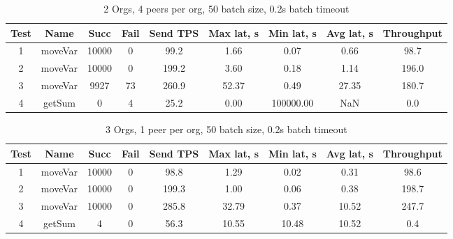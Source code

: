 \begin{appendices}
\begin{table}[h!]
\begin{center}
\begin{tabular}{ |c|c|c|c|c|c|c|c|c| }
 \hline
  Test & Name & Succ  & Fail & Send TPS & Max lat, s & Min lat, s & Avg lat, s & Throughput \\
 \hline
 \hline
 1    & moveVar & 10000 & 0    & 99.2  & 1.66      & 0.07      & 0.66      & 98.7  \\
 \hline
 2    & moveVar & 10000 & 0    & 199.2 & 3.60      & 0.18      & 1.14      & 196.0 \\
 \hline
 3    & moveVar & 9927  & 73   & 260.9 & 52.37     & 0.49      & 27.35     & 180.7 \\
 \hline
 4    & getSum  & 0     & 4    & 25.2  & 0.00      & 100000.00 & NaN       & 0.0   \\
 \hline
\end{tabular}
\end{center}
\caption{2 Orgs, 4 peers per org, 50 batch size, 0.2s batch timeout}
\end{table}

\begin{table}[h!]
\begin{center}
\begin{tabular}{ |c|c|c|c|c|c|c|c|c| }
 \hline
  Test & Name & Succ  & Fail & Send TPS & Max lat, s & Min lat, s & Avg lat, s & Throughput \\
 \hline
 \hline
 1    & moveVar & 10000 & 0    & 98.8  & 1.29      & 0.02      & 0.31      & 98.6  \\
 \hline
 2    & moveVar & 10000 & 0    & 199.3 & 1.00      & 0.06      & 0.38      & 198.7 \\
 \hline
 3    & moveVar & 10000 & 0    & 285.8 & 32.79     & 0.37      & 10.52     & 247.7 \\
 \hline
 4    & getSum  & 4     & 0    & 56.3  & 10.55     & 10.48     & 10.52     & 0.4   \\
 \hline
\end{tabular}
\end{center}
\caption{3 Orgs, 1 peer per org, 50 batch size, 0.2s batch timeout}
\end{table}


\end{appendices}
